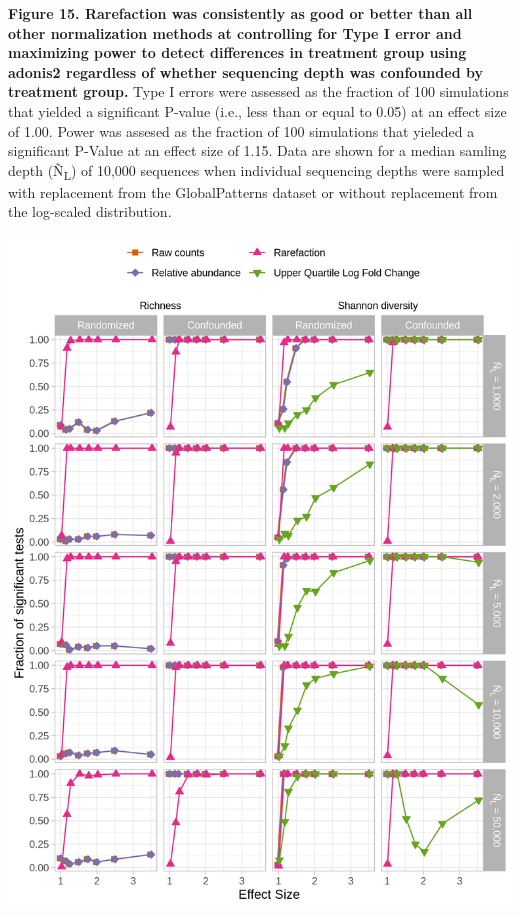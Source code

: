 \documentclass[
]{article}
\begin{document}
\textbf{Figure 15. Rarefaction was consistently as good or better than
all other normalization methods at controlling for Type I error and
maximizing power to detect differences in treatment group using adonis2
regardless of whether sequencing depth was confounded by treatment
group.} Type I errors were assessed as the fraction of 100 simulations
that yielded a significant P-value (i.e., less than or equal to 0.05) at
an effect size of 1.00. Power was assesed as the fraction of 100
simulations that yieleded a significant P-Value at an effect size of
1.15. Data are shown for a median samling depth (Ñ\textsubscript{L}) of
10,000 sequences when individual sequencing depths were sampled with
replacement from the GlobalPatterns dataset or without replacement from
the log-scaled distribution.

\newpage

\includegraphics{figure_16.png}
\end{document}
